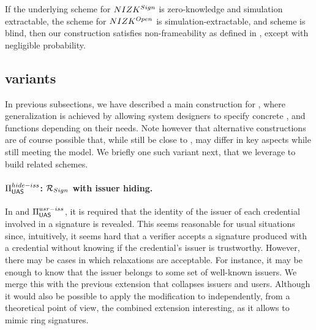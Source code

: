 \begin{theorem}
  \label{thm:frame-uas}
  If the underlying scheme for $NIZK^{Sign}$ is zero-knowledge and simulation
  extractable, the scheme for $NIZK^{Open}$ is simulation-extractable, and
  \SBCM scheme is blind, then our \CUASGen construction satisfies
  non-frameability as defined in , except with negligible
  probability.
\end{theorem}



\subsection{\CUASGen variants}
\label{ssec:variants}

In previous subsections, we have described a main construction for \CUASGen,
where generalization is achieved by allowing system designers to specify
concrete \fissue, \feval and \finsp functions depending on their needs. Note
however that alternative constructions are of course possible that, while
still be close to \CUASGen, may differ in key aspects while still meeting the
\UAS model. We briefly one such variant next, that we leverage to build related
schemes. 


\paragraph{$\Pi_{\mathsf{UAS}}^{hide-iss}$: $\mathcal{R}_{Sign}$ with issuer hiding.} %
In \CUASGen and $\Pi_{\mathsf{UAS}}^{usr-iss}$, it is required that the identity of the
issuer of each credential involved in a signature is revealed. This seems
reasonable for usual situations since, intuitively, it seems hard that a
verifier accepts a signature produced with a credential without knowing if the
credential's issuer is trustworthy. However, there may be cases in which
relaxations are acceptable. For instance, it may be enough to know that the
issuer belongs to some set of well-known issuers. We merge this with the
previous extension that collapses issuers and users. Although it would also be
possible to apply the modification to \CUASGen independently, from a theoretical
point of view, the combined extension interesting, as it allows to mimic ring
signatures. 

